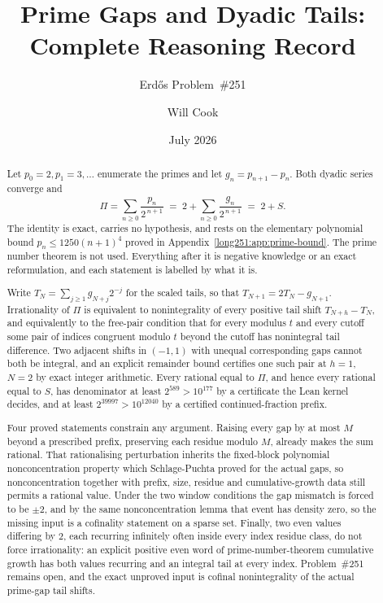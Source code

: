 \documentclass[11pt]{article}
\title{Prime Gaps and Dyadic Tails: Complete Reasoning Record}
\subtitle{Erd\H{o}s Problem~\#251}
\author{Will Cook}
\date{July 2026}
\begin{document}
\maketitle
\noteprovenance

\begin{abstract}
\noindent
Let $p_0=2,p_1=3,\ldots$ enumerate the primes and let $g_n=p_{n+1}-p_n$.  Both
dyadic series converge and
\[
 \Pi=\sum_{n\ge0}\frac{p_n}{2^{\,n+1}}
 \;=\;2+\sum_{n\ge0}\frac{g_n}{2^{\,n+1}}\;=\;2+S .
\]
The identity is exact, carries no hypothesis, and rests on the elementary
polynomial bound $p_n\le1250(n+1)^4$ proved in Appendix~\ref{long251:app:prime-bound}.
The prime number theorem is not used.  Everything after it is negative
knowledge or an exact reformulation, and each statement is labelled by what it
is.

Write $T_N=\sum_{j\ge1}g_{N+j}2^{-j}$ for the scaled tails, so that
$T_{N+1}=2T_N-g_{N+1}$.  Irrationality of $\Pi$ is equivalent to
nonintegrality of every positive tail shift $T_{N+h}-T_N$, and equivalently to
the free-pair condition that for every modulus $t$ and every cutoff some pair
of indices congruent modulo $t$ beyond the cutoff has nonintegral tail
difference.  Two adjacent shifts in $(-1,1)$ with unequal corresponding gaps
cannot both be integral, and an explicit remainder bound certifies one such
pair at $h=1$, $N=2$ by exact integer arithmetic.  Every rational equal to
$\Pi$, and hence every rational equal to $S$, has denominator at least
$2^{589}>10^{177}$ by a certificate the Lean kernel decides, and at least
$2^{39997}>10^{12040}$ by a certified continued-fraction prefix.

Four proved statements constrain any argument.  Raising every gap by at most
$M$ beyond a prescribed prefix, preserving each residue modulo $M$, already
makes the sum rational.  That rationalising perturbation inherits the
fixed-block polynomial nonconcentration property which Schlage-Puchta proved
for the actual gaps, so nonconcentration together with prefix, size, residue
and cumulative-growth data still permits a rational value.  Under the two
window conditions the gap mismatch is forced to be $\pm2$, and by the same
nonconcentration lemma that event has density zero, so the missing input is a
cofinality statement on a sparse set.  Finally, two even values differing by
$2$, each recurring infinitely often inside every index residue class, do not
force irrationality: an explicit positive even word of prime-number-theorem
cumulative growth has both values recurring and an integral tail at every
index.  Problem~\#251 remains open, and the exact unproved input is cofinal
nonintegrality of the actual prime-gap tail shifts.
\end{abstract}
\end{document}
